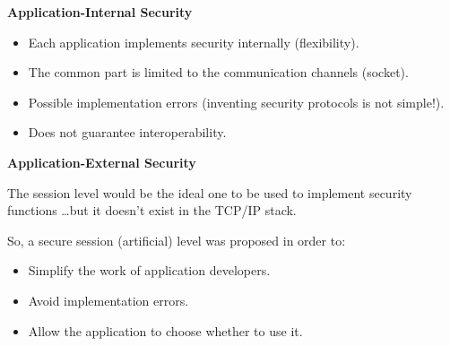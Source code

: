\begin{multicols}{2}
    \raggedcolumns

    {\large{\textbf{Application-Internal Security}}}

    \begin{itemize}
        \item Each application implements security internally (flexibility).
        \item The common part is limited to the communication channels (socket).
        \item Possible implementation errors (inventing security protocols is not simple!).
        \item Does not guarantee interoperability.
    \end{itemize}

    \columnbreak
    \columnseprule=1pt


    {\large{\textbf{Application-External Security}}}
    
    \vspace{0.45cm}

    The session level would be the ideal one to be used to implement security functions \dots but it doesn't exist in the TCP/IP stack.

    So, a secure session (artificial) level was proposed in order to:
\begin{itemize}
\item Simplify the work of application developers.
\item Avoid implementation errors.
\item Allow the application to choose whether to use it.
\end{itemize}
    
    
\end{multicols}



